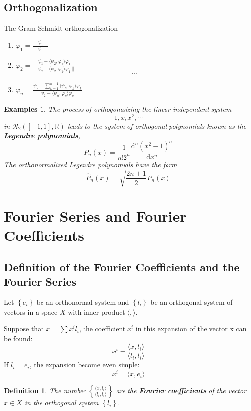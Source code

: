 \documentclass[a4paper,12pt]{article}
\newtheorem{definition}{Definition}[section]
\newtheorem{example}{Examples}
\begin{document}
    \subsection{Orthogonalization}
    The Gram-Schmidt orthogonalization 
    \begin{enumerate}[label={\rm(\arabic*)}]
        \item $\displaystyle \varphi_1 = \frac{\psi_1}{\|\psi_1\|}$
        \item $\displaystyle \varphi_2 = \frac{\psi_2 - 
               \langle \psi_2, \varphi_1\rangle \varphi_1}
               {\|\psi_2 - \langle \psi_2, \varphi_1\rangle \varphi_1\|}$
            \[\displaystyle \cdots\]
        \item $\displaystyle \varphi_n = \frac{\psi_2 - 
            \sum_{k=1}^{n-1}\langle \psi_n, \varphi_k\rangle \varphi_k}
               {\|\psi_2 - \langle \psi_n, \varphi_k\rangle \varphi_k\|}$
    \end{enumerate}

    \begin{example}
        The process of orthogonalizing the linear independent system 
        \[
            1, x, x^2, \cdots 
        \]
        in $\displaystyle \mathcal{R}_2([-1,1], \mathbb{R})$
        leads to the system of orthogonal polynomials known 
        as the \textbf{Legendre polynomials},
        \[
            P_n(x) = \frac{1}{n!2^n}\frac{{\mathrm{d}}^n\left(
            x^2-1\right)^n}{\mathrm{d}x^n}
        \]
        The orthonormalized Legendre polynomials have the form 
        \[
            \widehat{P}_n(x) = \sqrt{\frac{2n+1}{2}}P_n(x)
        \]
    \end{example}
    
    \section{Fourier Series and Fourier Coefficients}
    \subsection{Definition of the Fourier Coefficients and the Fourier Series}
    Let $\left\{e_i\right\}$ be an orthonormal system and 
    $\left\{l_i\right\}$ be an orthogonal system of vectors in a 
    space $X$ with inner product $\langle, \rangle$. 

    Suppose that $\displaystyle x = \sum x^il_i$, the coefficient 
    $x^i$ in this expansion of the vector x can be found:
    \[
        x^i = \frac{\langle x, l_i\rangle}{\langle l_i, l_i \rangle}
    \]
    If $l_i = e_i$, the expansion become even simple:
    \[
        x^i = \langle x, e_i \rangle
    \]
    \begin{definition}
        The number $\displaystyle \left\{\frac{\langle x, l_i \rangle}
        {\langle l_i, l_i \rangle}\right\}$ are the \textbf{Fourier 
        coefficients} of the vector $x \in X$ in the orthogonal system 
        $\displaystyle \left\{l_i\right\}$.
    \end{definition}
\end{document}
